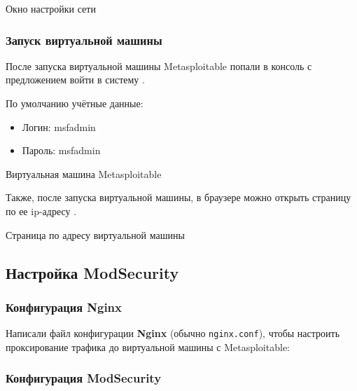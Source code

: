 \begin{image}
    \caption{Окно настройки сети}
    \label{fig:network}
\end{image}

\subsubsection{Запуск виртуальной машины}

После запуска виртуальной машины Metasploitable
попали в консоль с предложением войти в систему .

По умолчанию учётные данные:

\begin{itemize}
	\item Логин: msfadmin
	\item Пароль: msfadmin
\end{itemize}

\begin{image}
    \caption{Виртуальная машина Metasploitable}
    \label{fig:vm:run}
\end{image}

Также, после запуска виртуальной машины, в браузере можно открыть страницу
по ее ip-адресу .

\begin{image}
    \caption{Страница по адресу виртуальной машины}
    \label{fig:vm:run:web}
\end{image}

\subsection{Настройка ModSecurity}

\subsubsection{Конфигурация Nginx}

Написали файл конфигурации \textbf{Nginx} (обычно \texttt{nginx.conf}),
чтобы настроить проксирование трафика до виртуальной машины с Metasploitable:



\subsubsection{Конфигурация ModSecurity}

